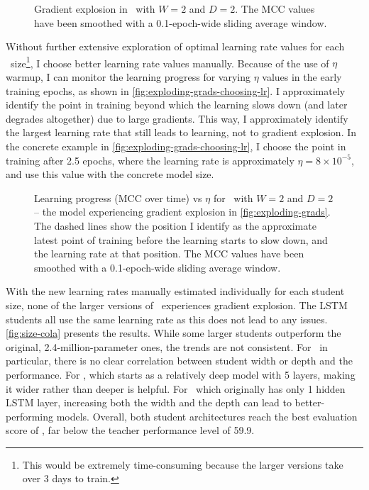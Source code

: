 {{{      \begin{figure}[h!t]
        \centering
        \caption{Gradient explosion in \BERTS~with $W=2$ and $D=2$. The MCC values have been smoothed with a 0.1-epoch-wide sliding average window.}
        \label{fig:exploding-grads}
      \end{figure}

      Without further extensive exploration of optimal learning rate values for each \BERTS~size\footnote{This would be extremely time-consuming because the larger versions take over 3 days to train.}, I choose better learning rate values manually.
      Because of the use of $\eta$ warmup, I can monitor the learning progress for varying $\eta$ values in the early training epochs, as shown in \autoref{fig:exploding-grads-choosing-lr}. I approximately identify the point in training beyond which the learning slows down (and later degrades altogether) due to large gradients. This way, I approximately identify the largest learning rate that still leads to learning, not to gradient explosion. In the concrete example in \autoref{fig:exploding-grads-choosing-lr}, I choose the point in training after 2.5 epochs, where the learning rate is approximately $\eta=8\times10^{-5}$, and use this value with the concrete model size.
      
      \begin{figure}[h!t]
        \centering
        \caption{Learning progress (MCC over time) vs $\eta$ for \BERTS~with $W=2$ and $D=2$ -- the model experiencing gradient explosion in \autoref{fig:exploding-grads}. The dashed lines show the position I identify as the approximate latest point of training before the learning starts to slow down, and the learning rate at that position.
        The MCC values have been smoothed with a 0.1-epoch-wide sliding average window.}
        \label{fig:exploding-grads-choosing-lr}
      \end{figure}

      With the new learning rates manually estimated individually for each student size, none of the larger versions of \BERTS~experiences gradient explosion. The LSTM students all use the same learning rate as this does not lead to any issues. \autoref{fig:size-cola} presents the results. While some larger students outperform the original, 2.4-million-parameter ones, the trends are not consistent. For \LSTMS~in particular, there is no clear correlation between student width or depth and the performance. For \BERTS, which starts as a relatively deep model with 5 layers, making it wider rather than deeper is helpful. For \LSTMS~which originally has only 1 hidden LSTM layer, increasing both the width and the depth can lead to better-performing models. Overall, both student architectures reach the best evaluation score of , far below the teacher performance level of 59.9. 

}}}
